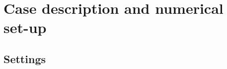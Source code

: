 \documentclass[draft,a4paper,11pt]{article}
\begin{document}
\section{Case description and numerical set-up}
\label{setup}
%
%

\subsection{Settings}
\end{document}
